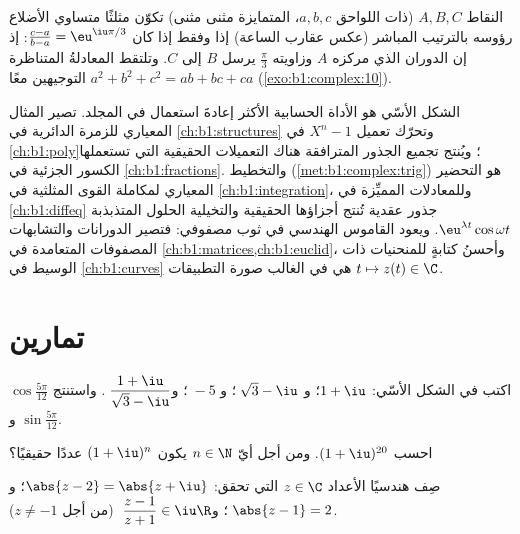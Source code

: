 \begin{example}\label{ex:b1:complex:equilateral}
النقاط $A, B, C$ (ذات اللواحق $a, b, c$، المتمايزة مثنى مثنى) تكوّن
مثلثًا متساوي الأضلاع رؤوسه بالترتيب المباشر (عكس عقارب الساعة)
إذا وفقط إذا كان $\frac{c - a}{b - a} = \eu^{\iu\pi/3}$: إذ إن الدوران
الذي مركزه $A$ وزاويته $\frac\pi3$ يرسل $B$ إلى $C$. وتلتقط
المعادلةُ المتناظرة $a^2 + b^2 + c^2 = ab
+ bc + ca$ التوجيهين معًا (\cref{exo:b1:complex:10}).
\end{example}

\begin{remark}\label{rem:b1:complex:whereused}
الشكل الأسّي هو الأداة الحسابية الأكثر إعادةَ استعمال في المجلد.
 تصير المثال المعياري للزمرة الدائرية في
\cref{ch:b1:structures} وتحرّك تعميل $X^n - 1$ في
\cref{ch:b1:poly}؛ ويُنتج تجميع الجذور المترافقة هناك
التعميلات الحقيقية التي تستعملها الكسور الجزئية في
\cref{ch:b1:fractions}. والتخطيط (\cref{met:b1:complex:trig})
هو التحضير المعياري لمكاملة القوى المثلثية في
\cref{ch:b1:integration}، وللمعادلات المميِّزة في
\cref{ch:b1:diffeq} جذور عقدية تُنتج أجزاؤها الحقيقية
والتخيلية الحلول المتذبذبة $\eu^{\lambda t}\cos\omega
t$. ويعود القاموس الهندسي في ثوب مصفوفي: فتصير الدورانات
والتشابهات المصفوفات المتعامدة في
\cref{ch:b1:matrices,ch:b1:euclid}، وأحسنُ كتابةٍ للمنحنيات ذات الوسيط في
\cref{ch:b1:curves} هي في الغالب صورة التطبيقات $t \mapsto z(t)
\in \C$.
\end{remark}

\section{تمارين}

\begin{exercise}[$\star$]\label{exo:b1:complex:1}
اكتب في الشكل الأسّي: $1 + \iu$؛ و $\;\sqrt 3 - \iu$؛ و $\;-5$؛
و$\;\dfrac{1 + \iu}{\sqrt 3 - \iu}$. واستنتج
$\cos\frac{5\pi}{12}$ و $\sin\frac{5\pi}{12}$.
\end{exercise}

\begin{exercise}[$\star$]\label{exo:b1:complex:2}
احسب $(1 + \iu)^{20}$. ومن أجل أيّ $n \in \N$ يكون $(1 + \iu)^n$
عددًا حقيقيًا؟
\end{exercise}

\begin{exercise}[$\star$]\label{exo:b1:complex:3}
صِف هندسيًا  الأعداد $z \in \C$ التي تحقق:
$\abs{z - 2} = \abs{z + \iu}$؛ و $\;\abs{z - 1} = 2$؛
و$\;\dfrac{z - 1}{z + 1} \in \iu\R$ (من أجل $z \neq -1$).
\end{exercise}


